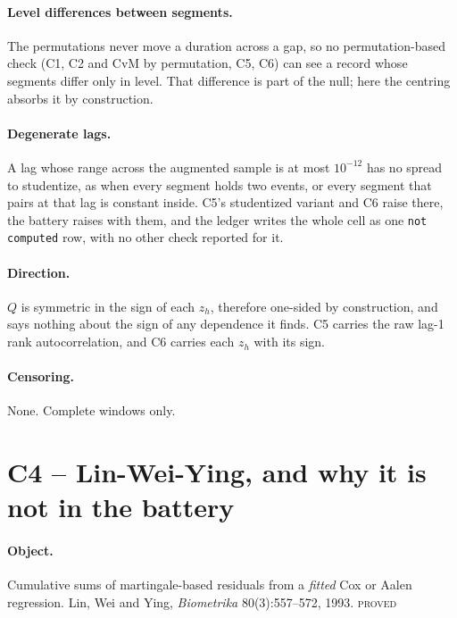 \documentclass[11pt,a4paper]{article}
\newcommand{\PROVED}{\textsc{\textcolor{blue!55!black}{proved}}}
\begin{document}
\paragraph{Level differences between segments.} The permutations never move a duration
across a gap, so no permutation-based check (C1, C2 and CvM by permutation, C5, C6) can
see a record whose segments differ only in level. That difference is part of the null;
here the centring absorbs it by construction.

\paragraph{Degenerate lags.} A lag whose range across the augmented sample is at most
$10^{-12}$ has no spread to studentize, as when every segment holds two events, or every
segment that pairs at that lag is constant inside. C5's studentized variant and C6 raise
there, the battery raises with them, and the ledger writes the whole cell as one
\texttt{not computed} row, with no other check reported for it.

\paragraph{Direction.} $Q$ is symmetric in the sign of each $z_h$, therefore one-sided by
construction, and says nothing about the sign of any dependence it finds. C5 carries the
raw lag-1 rank autocorrelation, and C6 carries each $z_h$ with its sign.

\paragraph{Censoring.} None. Complete windows only.

\section{C4 -- Lin-Wei-Ying, and why it is not in the battery}
\label{sec:lwy}

\paragraph{Object.} Cumulative sums of martingale-based residuals from a \emph{fitted}
Cox or Aalen regression. Lin, Wei and Ying, \emph{Biometrika} 80(3):557--572, 1993.
\PROVED
\end{document}
